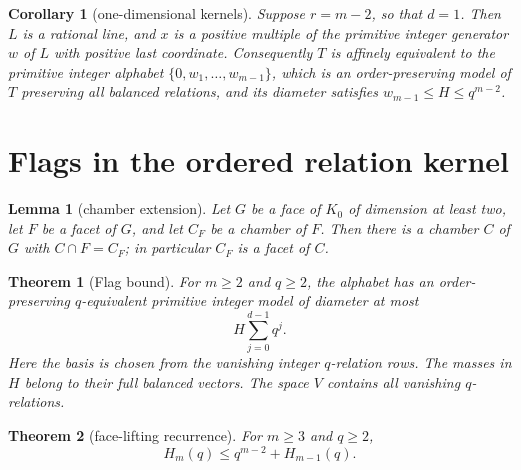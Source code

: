 \documentclass[10pt,a4paper]{amsart}
\newtheorem{lemma}{Lemma}
\newtheorem{corollary}{Corollary}
\newtheorem{theorem}{Theorem}
\begin{document}
\begin{corollary}[one-dimensional kernels]\label{M-cor:max-rank}
Suppose $r=m-2$, so that $d=1$. Then $L$ is a rational line, and $x$ is a
positive multiple of the primitive integer generator $w$ of $L$ with positive
last coordinate. Consequently $T$ is affinely equivalent to the primitive
integer alphabet $\{0,w_1,\ldots,w_{m-1}\}$, which is an order-preserving
model of $T$ preserving all balanced relations, and its diameter satisfies
$w_{m-1}\le H\le q^{m-2}$.
\end{corollary}

\section{Flags in the ordered relation kernel}\label{M-sec:flag}

\begin{lemma}[chamber extension]\label{M-lem:chamber-extension}
Let $G$ be a face of $K_0$ of dimension at least two, let $F$ be a facet of
$G$, and let $C_F$ be a chamber of $F$. Then there is a chamber $C$ of $G$
with $C\cap F=C_F$; in particular $C_F$ is a facet of $C$.
\end{lemma}

\begin{theorem}[Flag bound]\label{M-thmD}\label{M-thm:flag-model}
For $m\ge2$ and $q\ge2$, the alphabet has an order-preserving $q$-equivalent
primitive integer model of diameter at most
\[
 H\sum_{j=0}^{d-1}q^j.
\]
Here the basis is chosen from the vanishing integer $q$-relation rows.
The masses in $H$ belong to their full balanced vectors. The space $V$
contains all vanishing $q$-relations.
\end{theorem}

\begin{theorem}[face-lifting recurrence]\label{M-thm:lifting}
For $m\ge3$ and $q\ge2$,
\begin{equation}\label{M-eq:recurrence}
 H_m(q)\le q^{m-2}+H_{m-1}(q).
\end{equation}
\end{theorem}
\end{document}
